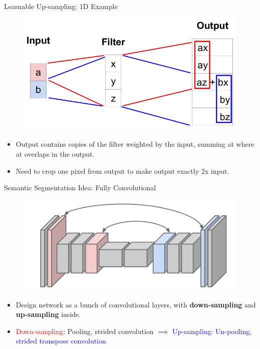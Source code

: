 \documentclass[aspectratio=169]{beamer}
\begin{document}
\begin{frame}{Learnable Up-sampling: 1D Example}
\begin{figure}
    \centering
    \includegraphics[scale=.35]{demo/figs/tconv12.png}
\end{figure}
\begin{itemize}
    \item Output contains copies of the filter weighted by the input, summing at where at overlaps in the output.
    \item Need to crop one pixel from output to make output exactly 2x input.
\end{itemize}
\end{frame}

\begin{frame}{Semantic Segmentation Idea: Fully Convolutional}
\begin{figure}
    \centering
    \includegraphics[scale=.25]{demo/figs/encoderdecoder.png}
\end{figure}
\begin{itemize}
    \item Design network as a bunch of convolutional layers, with \textbf{down-sampling} and \textbf{up-sampling} inside.
    \item \textcolor{red}{Down-sampling}: Pooling, strided convolution $\implies$ \textcolor{blue}{Up-sampling: Un-pooling, strided transpose convolution}
\end{itemize}
\end{frame}
\end{document}
